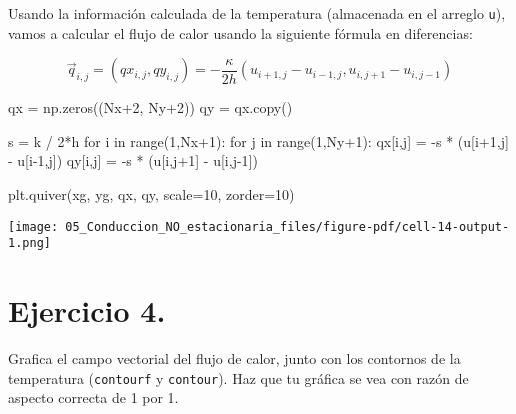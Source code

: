 \documentclass[
  letterpaper,
  DIV=11,
  numbers=noendperiod]{scrreprt}
\newenvironment{Shaded}{\begin{snugshade}}{\end{snugshade}}
\newcommand{\BuiltInTok}[1]{\textcolor[rgb]{0.00,0.23,0.31}{#1}}
\newcommand{\ControlFlowTok}[1]{\textcolor[rgb]{0.00,0.23,0.31}{#1}}
\newcommand{\DecValTok}[1]{\textcolor[rgb]{0.68,0.00,0.00}{#1}}
\newcommand{\KeywordTok}[1]{\textcolor[rgb]{0.00,0.23,0.31}{#1}}
\newcommand{\NormalTok}[1]{\textcolor[rgb]{0.00,0.23,0.31}{#1}}
\newcommand{\OperatorTok}[1]{\textcolor[rgb]{0.37,0.37,0.37}{#1}}
\begin{document}
Usando la información calculada de la temperatura (almacenada en el
arreglo \texttt{u}), vamos a calcular el flujo de calor usando la
siguiente fórmula en diferencias:

\[
\vec{q}_{i,j} = (qx_{i,j}, qy_{i,j}) = -\dfrac{\kappa}{2h} (u_{i+1,j}-u_{i-1,j}, u_{i,j+1}-u_{i,j-1} )
\]

\begin{Shaded}
\begin{Highlighting}[]
\NormalTok{qx }\OperatorTok{=}\NormalTok{ np.zeros((Nx}\OperatorTok{+}\DecValTok{2}\NormalTok{, Ny}\OperatorTok{+}\DecValTok{2}\NormalTok{))}
\NormalTok{qy }\OperatorTok{=}\NormalTok{ qx.copy()}

\NormalTok{s }\OperatorTok{=}\NormalTok{ k }\OperatorTok{/} \DecValTok{2}\OperatorTok{*}\NormalTok{h}
\ControlFlowTok{for}\NormalTok{ i }\KeywordTok{in} \BuiltInTok{range}\NormalTok{(}\DecValTok{1}\NormalTok{,Nx}\OperatorTok{+}\DecValTok{1}\NormalTok{):}
    \ControlFlowTok{for}\NormalTok{ j }\KeywordTok{in} \BuiltInTok{range}\NormalTok{(}\DecValTok{1}\NormalTok{,Ny}\OperatorTok{+}\DecValTok{1}\NormalTok{):}
\NormalTok{        qx[i,j] }\OperatorTok{=} \OperatorTok{{-}}\NormalTok{s }\OperatorTok{*}\NormalTok{ (u[i}\OperatorTok{+}\DecValTok{1}\NormalTok{,j] }\OperatorTok{{-}}\NormalTok{ u[i}\OperatorTok{{-}}\DecValTok{1}\NormalTok{,j])}
\NormalTok{        qy[i,j] }\OperatorTok{=} \OperatorTok{{-}}\NormalTok{s }\OperatorTok{*}\NormalTok{ (u[i,j}\OperatorTok{+}\DecValTok{1}\NormalTok{] }\OperatorTok{{-}}\NormalTok{ u[i,j}\OperatorTok{{-}}\DecValTok{1}\NormalTok{])}

\NormalTok{plt.quiver(xg, yg, qx, qy, scale}\OperatorTok{=}\DecValTok{10}\NormalTok{, zorder}\OperatorTok{=}\DecValTok{10}\NormalTok{)}
\end{Highlighting}
\end{Shaded}

\texttt{[image: 05\_Conduccion\_NO\_estacionaria\_files/figure-pdf/cell-14-output-1.png]}

\section{Ejercicio 4.}\label{ejercicio-4.-1}

Grafica el campo vectorial del flujo de calor, junto con los contornos
de la temperatura (\texttt{contourf} y \texttt{contour}). Haz que tu
gráfica se vea con razón de aspecto correcta de 1 por 1.
\end{document}

